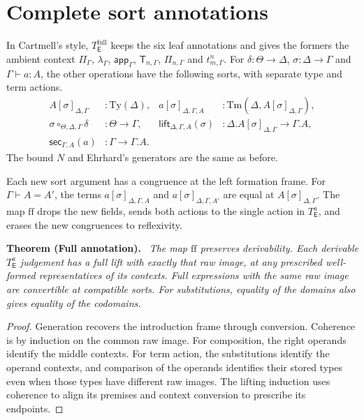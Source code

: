 \documentclass[11pt]{article}
\newenvironment{theorem}[1]{\par\medskip\noindent\textbf{Theorem #1.}\ \itshape}{\par\medskip}
\theoremstyle{definition}
\theoremstyle{remark}
\newcommand{\T}{\mathsf T}
\newcommand{\lift}{\mathsf{lift}}
\newcommand{\sect}{\mathsf{sec}}
\newcommand{\app}{\mathsf{app}}
\begin{document}
\section{Complete sort annotations}\label{sec:fullannot}

In Cartmell's style, $T_{\mathsf E}^{\mathrm{full}}$ keeps the six leaf
annotations and gives the formers the ambient context
$\Pi_\Gamma$, $\lambda_\Gamma$, $\app_\Gamma$, $\T_{n,\Gamma}$,
$\Pi_{n,\Gamma}$ and $t^n_{m,\Gamma}$. For $\delta:\Theta\to\Delta$,
$\sigma:\Delta\to\Gamma$ and $\Gamma\vdash a:A$, the other operations
have the following sorts, with separate type and term actions.
\begin{align*}
 A[\sigma]_{\Delta,\Gamma} &:\mathrm{Ty}(\Delta),&
 a[\sigma]_{\Delta,\Gamma,A} &:\mathrm{Tm}(\Delta,A[\sigma]_{\Delta,\Gamma}),\\
 \sigma\circ_{\Theta,\Delta,\Gamma}\delta &:\Theta\to\Gamma,&
 \lift_{\Delta,\Gamma,A}(\sigma) &:\Delta.A[\sigma]_{\Delta,\Gamma}\to\Gamma.A,\\
 \sect_{\Gamma,A}(a)&:\Gamma\to\Gamma.A.
\end{align*}
The bound $N$ and Ehrhard's generators are the same as before.

Each new sort argument has a congruence at the left formation frame.
For $\Gamma\vdash A=A'$, the terms $a[\sigma]_{\Delta,\Gamma,A}$
and $a[\sigma]_{\Delta,\Gamma,A'}$ are equal at $A[\sigma]_{\Delta,\Gamma}$.
The map $\mathrm{ff}$ drops the new fields, sends both actions to
the single action in $T_{\mathsf E}^{a}$, and erases the new congruences
to reflexivity.

\begin{theorem}{(Full annotation)}
The map $\mathrm{ff}$ preserves derivability. Each derivable
$T_{\mathsf E}^{a}$ judgement has a full lift with exactly that raw image,
at any prescribed well-formed representatives of its contexts.
Full expressions with the same raw image are convertible at compatible
sorts. For substitutions, equality of the domains also gives equality
of the codomains.
\end{theorem}
\begin{proof}
Generation recovers the introduction frame through conversion.
Coherence is by induction on the common raw image. For composition,
the right operands identify the middle contexts. For term action,
the substitutions identify the operand contexts, and comparison of
the operands identifies their stored types even when those types
have different raw images. The lifting induction uses coherence to
align its premises and context conversion to prescribe its endpoints.
\end{proof}
\end{document}
